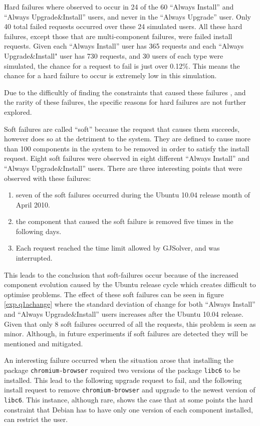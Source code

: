 Hard failures where observed to occur in 24 of the 60 ``Always Install'' and ``Always Upgrade\&Install'' users, and never in the ``Always Upgrade'' user.
Only 40 total failed requests occurred over these 24 simulated users.
All these hard failures, except those that are multi-component failures, were failed install requests.
Given each ``Always Install'' user has 365 requests and each ``Always Upgrade\&Install" user has 730 requests, 
and 30 users of each type were simulated, the chance for a request to fail is just over 0.12\%.
This means the chance for a hard failure to occur is extremely low in this simulation.

Due to the difficultly of finding the constraints that caused these failures \citep{quickxplain},
and the rarity of these failures, the specific reasons for hard failures are not further explored.

Soft failures are called ``soft'' because the request that causes them succeeds, however does so at the detriment to the system.
They are defined to cause more than 100 components in the system to be removed in order to satisfy the install request.
Eight soft failures were observed in eight different ``Always Install'' and ``Always Upgrade\&Install'' users.
There are three interesting points that were observed with these failures:
\begin{enumerate}
  \item seven of the soft failures occurred during the Ubuntu 10.04 release month of April 2010.
  \item the component that caused the soft failure is removed five times in the following days.
  \item Each request reached the time limit allowed by GJSolver, and was interrupted. 
\end{enumerate}
This leads to the conclusion that soft-failures occur because of the increased component evolution caused by the Ubuntu release cycle which creates difficult to optimise problems.
The effect of these soft failures can be seen in figure \ref{exp.q1achange} 
where the standard deviation of change for both ``Always Install'' and ``Always Upgrade\&Install'' users increases after the Ubuntu 10.04 release.
Given that only 8 soft failures occurred of all the requests, this problem is seen as minor.
Although, in future experiments if soft failures are detected they will be mentioned and mitigated. 

An interesting failure occurred when the situation arose that installing the package \texttt{chromium-browser} required two versions of the package \texttt{libc6} to be installed. 
This lead to the following upgrade request to fail, and the following install request to remove \texttt{chromium-browser} and upgrade to the newest version of \texttt{libc6}.
This instance, although rare, shows the case that at some points the hard constraint that Debian has to have only one version of each component installed,
can restrict the user.


